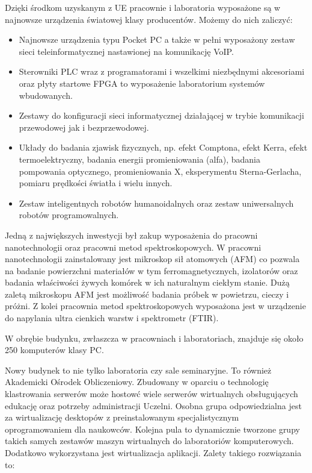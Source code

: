 \documentclass[a4paper,12pt]{article}
\begin{document}
Dzięki środkom uzyskanym z UE pracownie i laboratoria wyposażone są w najnowsze urządzenia światowej klasy producentów. Możemy do nich zaliczyć:
\begin{itemize}
\item Najnowsze urządzenia typu Pocket PC a także w pełni wyposażony zestaw sieci teleinformatycznej nastawionej na komunikację VoIP.
\item Sterowniki PLC wraz z programatorami i wszelkimi niezbędnymi akcesoriami oraz płyty startowe FPGA to wyposażenie laboratorium systemów wbudowanych.
\item Zestawy do konfiguracji sieci informatycznej działającej w trybie komunikacji przewodowej jak i bezprzewodowej.
\item Układy do badania zjawisk fizycznych, np. efekt Comptona, efekt Kerra, efekt termoelektryczny, badania energii promieniowania (alfa), badania pompowania optycznego, promieniowania X, eksperymentu Sterna-Gerlacha, pomiaru prędkości światła i wielu innych.
\item Zestaw inteligentnych robotów humanoidalnych oraz zestaw uniwersalnych robotów programowalnych.
\end{itemize}

Jedną z największych inwestycji był zakup wyposażenia do pracowni nanotechnologii oraz pracowni metod spektroskopowych. W pracowni nanotechnologii zainstalowany jest mikroskop sił atomowych (AFM) co pozwala na badanie powierzchni materiałów w tym ferromagnetycznych, izolatorów oraz badania właściwości żywych komórek w ich naturalnym ciekłym stanie. Dużą zaletą mikroskopu AFM jest możliwość badania próbek w powietrzu, cieczy i próżni. Z kolei pracownia metod spektroskopowych wyposażona jest w urządzenie do napylania ultra cienkich warstw i spektrometr (FTIR).

W obrębie budynku, zwłaszcza w pracowniach i laboratoriach, znajduje się około 250 komputerów klasy PC.

Nowy budynek to nie tylko laboratoria czy sale seminaryjne. To również Akademicki Ośrodek Obliczeniowy. Zbudowany w oparciu o technologię klastrowania serwerów może hostowć wiele serwerów wirtualnych
obsługujących edukację oraz potrzeby administracji Uczelni. Osobna grupa odpowiedzialna jest za wirtualizację desktopów z preinstalowanym specjalistycznym oprogramowaniem dla naukowców. Kolejna pula to dynamicznie tworzone grupy takich samych zestawów maszyn wirtualnych do laboratoriów
komputerowych. Dodatkowo wykorzystana jest wirtualizacja aplikacji. Zalety takiego rozwiązania to:
\end{document}
